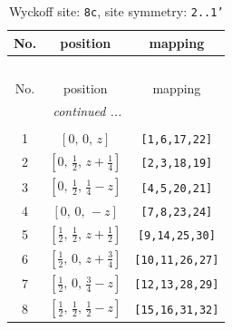 \documentclass[fleqn,8pt]{jsarticle}
\begin{document}
\renewcommand{\arraystretch}{1.2}
\begin{longtable}{ccc}
\caption{Wyckoff site: {\tt 8c}, site symmetry: {\tt 2..1'}}
 \\
 \hline \hline
No. & position & mapping \\ \hline \endfirsthead

\multicolumn{2}{l}{\tablename\ \thetable{}} \\
 \hline \hline
No. & position & mapping \\ \hline \endhead

 \hline \hline
\multicolumn{2}{r}{\footnotesize\it continued ...} \\ \endfoot

 \hline \hline
\multicolumn{2}{r}{} \\ \endlastfoot

1 & $\left[ 0,\, 0,\, z \right]$ & {\tt [1,6,17,22]} \\ \hline
2 & $\left[ 0,\, \frac{1}{2},\, z + \frac{1}{4} \right]$ & {\tt [2,3,18,19]} \\ \hline
3 & $\left[ 0,\, \frac{1}{2},\, \frac{1}{4} - z \right]$ & {\tt [4,5,20,21]} \\ \hline
4 & $\left[ 0,\, 0,\, - z \right]$ & {\tt [7,8,23,24]} \\ \hline
5 & $\left[ \frac{1}{2},\, \frac{1}{2},\, z + \frac{1}{2} \right]$ & {\tt [9,14,25,30]} \\ \hline
6 & $\left[ \frac{1}{2},\, 0,\, z + \frac{3}{4} \right]$ & {\tt [10,11,26,27]} \\ \hline
7 & $\left[ \frac{1}{2},\, 0,\, \frac{3}{4} - z \right]$ & {\tt [12,13,28,29]} \\ \hline
8 & $\left[ \frac{1}{2},\, \frac{1}{2},\, \frac{1}{2} - z \right]$ & {\tt [15,16,31,32]} \\
\end{longtable}
\renewcommand{\arraystretch}{1.2}
\end{document}
